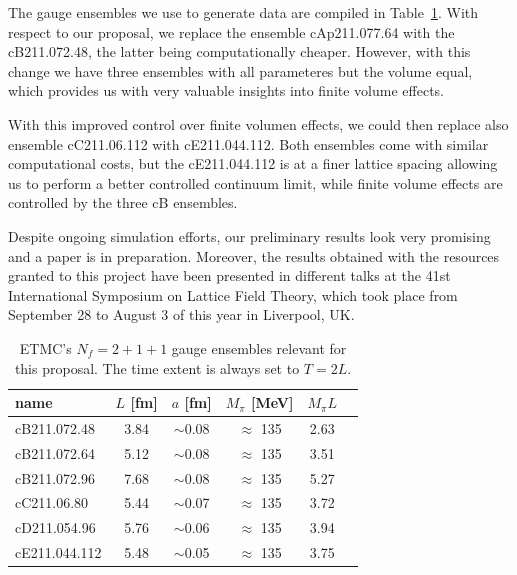 \documentclass [a4paper, 11pt]{article}
\begin{document}
The gauge ensembles we use to generate data are compiled in Table~\ref{tab:ensembles}.
With respect to our proposal, we replace the ensemble cAp211.077.64
with the cB211.072.48, the latter being computationally
cheaper. However, with this change we have three ensembles with all
parameteres but the volume equal, which provides us with very valuable
insights into finite volume effects.

With this improved control over finite volumen effects, we could then
replace also ensemble cC211.06.112 with cE211.044.112. Both 
ensembles come with similar computational costs, but the cE211.044.112
is at a finer lattice spacing allowing us to perform a better
controlled continuum limit, while finite volume effects are controlled
by the three cB ensembles.

Despite ongoing simulation efforts, our preliminary results
look very promising and a paper is in preparation.  
Moreover, the results obtained with the resources granted to this
project have been presented in different talks at the 41st
International Symposium on Lattice Field Theory, which took place from
September 28 to August 3 of this year in Liverpool, UK.


\begin{table}[h]
  \centering %
  \begin{tabular}{lccccr} %
    \hline
    name          & $L$ [fm]      & $a$
    [fm]          & $M_\pi$ [MeV] & $M_\pi L$                         \\
    \hline
    \hline
    cB211.072.48  & 3.84          & $\sim$0.08 & $\approx$ 135 & 2.63 \\
    cB211.072.64  & 5.12          & $\sim$0.08 & $\approx$ 135 & 3.51 \\
    cB211.072.96  & 7.68          & $\sim$0.08 & $\approx$ 135 & 5.27 \\
    \hline
    cC211.06.80   & 5.44          & $\sim$0.07 & $\approx$ 135 & 3.72 \\
    \hline
    cD211.054.96  & 5.76          & $\sim$0.06 & $\approx$ 135 & 3.94 \\
    \hline
    cE211.044.112 & 5.48          & $\sim$0.05 & $\approx$ 135 & 3.75 \\
    \hline
  \end{tabular}
  \caption{ETMC's $N_f=2+1+1$ gauge ensembles relevant for this
    proposal. The time extent is always set to $T=2L$.}
  \label{tab:ensembles}
\end{table}
\end{document}
